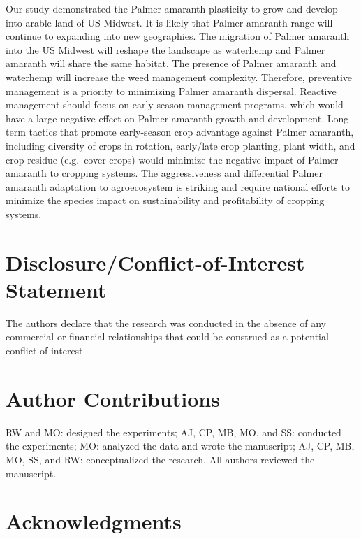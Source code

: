 \documentclass[utf8]{frontiersSCNS}
\begin{document}
Our study demonstrated the Palmer amaranth plasticity to grow and
develop into arable land of US Midwest. It is likely that Palmer
amaranth range will continue to expanding into new geographies. The
migration of Palmer amaranth into the US Midwest will reshape the
landscape as waterhemp and Palmer amaranth will share the same habitat.
The presence of Palmer amaranth and waterhemp will increase the weed
management complexity. Therefore, preventive management is a priority to
minimizing Palmer amaranth dispersal. Reactive management should focus
on early-season management programs, which would have a large negative
effect on Palmer amaranth growth and development. Long-term tactics that
promote early-season crop advantage against Palmer amaranth, including
diversity of crops in rotation, early/late crop planting, plant width,
and crop residue (e.g.~cover crops) would minimize the negative impact
of Palmer amaranth to cropping systems. The aggressiveness and
differential Palmer amaranth adaptation to agroecosystem is striking and
require national efforts to minimize the species impact on
sustainability and profitability of cropping systems.

\hypertarget{disclosureconflict-of-interest-statement}{%
\section*{Disclosure/Conflict-of-Interest
Statement}\label{disclosureconflict-of-interest-statement}}

The authors declare that the research was conducted in the absence of
any commercial or financial relationships that could be construed as a
potential conflict of interest.

\hypertarget{author-contributions}{%
\section*{Author Contributions}\label{author-contributions}}

RW and MO: designed the experiments; AJ, CP, MB, MO, and SS: conducted
the experiments; MO: analyzed the data and wrote the manuscript; AJ, CP,
MB, MO, SS, and RW: conceptualized the research. All authors reviewed
the manuscript.

\hypertarget{acknowledgments}{%
\section*{Acknowledgments}\label{acknowledgments}}
\end{document}
